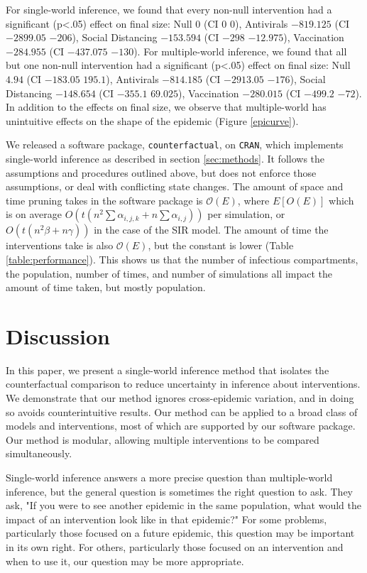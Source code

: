 \documentclass[openacc]{rsproca_new}%
\begin{document}
For single-world inference, we found that every non-null intervention had a significant (p<.05) effect on final size: Null $ 0 $ (CI $ 0 $ \textemdash $ 0 $), Antivirals $ -819.125 $ (CI $ -2899.05 $ \textemdash $ -206 $), Social Distancing $ -153.594 $ (CI $ -298 $ \textemdash $ -12.975 $), Vaccination $ -284.955 $ (CI $ -437.075 $ \textemdash $ -130 $).
For multiple-world inference, we found that all but one non-null intervention had a significant (p<.05) effect on final size: Null $ 4.94 $ (CI $ -183.05 $ \textemdash $ 195.1 $), Antivirals $ -814.185 $ (CI $ -2913.05 $ \textemdash $ -176 $), Social Distancing $ -148.654 $ (CI $ -355.1 $ \textemdash $ 69.025 $), Vaccination $ -280.015 $ (CI $ -499.2 $ \textemdash $ -72 $).
In addition to the effects on final size, we observe that multiple-world has unintuitive effects on the shape of the epidemic (Figure \ref{epicurve}).

We released a software package, \texttt{counterfactual}, on \texttt{CRAN}, %
which implements single-world inference as described in section \ref{sec:methods}.
It follows the assumptions and procedures outlined above, but does not enforce those assumptions, or deal with conflicting state changes.
The amount of space and time pruning takes in the software package is $\mathcal O(E)$, where $E[O(E)]$ which is on average $O(t(n^2\sum \alpha_{i,j,k} + n \sum\alpha_{i,j}))$ per simulation, or $O(t(n^2\beta + n\gamma))$ in the case of the SIR model.
The amount of time the interventions take is also $\mathcal O(E)$, but the constant is lower (Table \ref{table:performance}).
This shows us that the number of infectious compartments, the population, number of times, and number of simulations all impact the amount of time taken, but mostly population.

\section{Discussion}
In this paper, we present a single-world inference method that isolates the counterfactual comparison to reduce uncertainty in inference about interventions.
We demonstrate that our method ignores cross-epidemic variation, and in doing so avoids counterintuitive results.
Our method can be applied to a broad class of models and interventions, most of which are supported by our software package.
Our method is modular, allowing multiple interventions to be compared simultaneously.

Single-world inference answers a more precise question than multiple-world inference, but the general question is sometimes the right question to ask.
They ask, "If you were to see another epidemic in the same population, what would the impact of an intervention look like in that epidemic?"
For some problems, particularly those focused on a future epidemic, this question may be important in its own right.
For others, particularly those focused on an intervention and when to use it, our question may be more appropriate.
\end{document}
